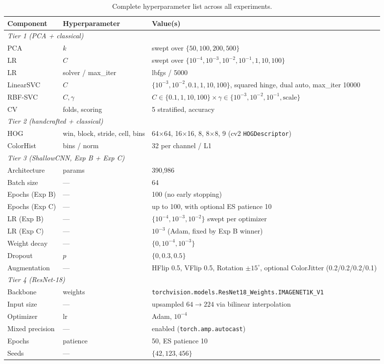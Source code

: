 \documentclass[10pt,letterpaper]{article}
\begin{document}
\begin{table}[h]
\centering
\small
\caption{Complete hyperparameter list across all experiments.}
\label{tab:hparams}
\begin{tabular}{llp{8cm}}
\toprule
\textbf{Component} & \textbf{Hyperparameter} & \textbf{Value(s)} \\
\midrule
\multicolumn{3}{l}{\emph{Tier 1 (PCA + classical)}} \\
PCA & $k$ & swept over $\{50, 100, 200, 500\}$ \\
LR  & $C$ & swept over $\{10^{-4}, 10^{-3}, 10^{-2}, 10^{-1}, 1, 10, 100\}$ \\
LR  & solver / max\_iter & lbfgs / 5000 \\
LinearSVC & $C$ & $\{10^{-3}, 10^{-2}, 0.1, 1, 10, 100\}$, squared hinge, dual auto, max\_iter 10000 \\
RBF-SVC & $C, \gamma$ & $C \in \{0.1, 1, 10, 100\} \times \gamma \in \{10^{-3}, 10^{-2}, 10^{-1}, \text{scale}\}$ \\
CV  & folds, scoring & 5 stratified, accuracy \\
\midrule
\multicolumn{3}{l}{\emph{Tier 2 (handcrafted + classical)}} \\
HOG & win, block, stride, cell, bins & 64$\times$64, 16$\times$16, 8, 8$\times$8, 9 (cv2 \texttt{HOGDescriptor}) \\
ColorHist & bins / norm & 32 per channel / L1 \\
\midrule
\multicolumn{3}{l}{\emph{Tier 3 (ShallowCNN, Exp B + Exp C)}} \\
Architecture & params & 390{,}986 \\
Batch size & --- & 64 \\
Epochs (Exp B) & --- & 100 (no early stopping) \\
Epochs (Exp C) & --- & up to 100, with optional ES patience 10 \\
LR (Exp B) & --- & $\{10^{-4}, 10^{-3}, 10^{-2}\}$ swept per optimizer \\
LR (Exp C) & --- & $10^{-3}$ (Adam, fixed by Exp B winner) \\
Weight decay & --- & $\{0, 10^{-4}, 10^{-3}\}$ \\
Dropout & $p$ & $\{0, 0.3, 0.5\}$ \\
Augmentation & --- & HFlip 0.5, VFlip 0.5, Rotation $\pm 15^\circ$, optional ColorJitter (0.2/0.2/0.2/0.1) \\
\midrule
\multicolumn{3}{l}{\emph{Tier 4 (ResNet-18)}} \\
Backbone & weights & \texttt{torchvision.models.ResNet18\_Weights.IMAGENET1K\_V1} \\
Input size & --- & upsampled $64 \rightarrow 224$ via bilinear interpolation \\
Optimizer & lr & Adam, $10^{-4}$ \\
Mixed precision & --- & enabled (\texttt{torch.amp.autocast}) \\
Epochs & patience & 50, ES patience 10 \\
Seeds & --- & $\{42, 123, 456\}$ \\
\bottomrule
\end{tabular}
\end{table}
\end{document}
